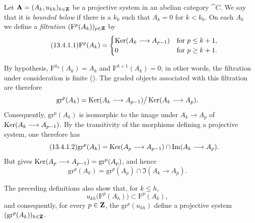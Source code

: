 \begin{env}[13.4.1]
\label{0.13.4.1}
Let
$\mathbf{A}=(A_k,u_{kh})_{k\in\mathbf{Z}}$ be a projective system in an
abelian category $\cat{C}$.
We say that it is \emph{bounded below} if there is a $k_0$ such that
$A_k=0$ for $k<k_0$.
On each $A_k$ we define a \emph{filtration}
$(\mathrm{F}^p(A_k))_{p\in\mathbf{Z}}$ by
\begin{equation}
\label{0.13.4.1.1}
\tag{13.4.1.1}
  \mathrm{F}^p(A_k)=
  \begin{cases}
    \operatorname{Ker}(A_k\longrightarrow A_{p-1}) & \text{for }p\leq k+1,\\
    0 & \text{for }p\geq k+1.
  \end{cases}
\end{equation}

By hypothesis,
$\mathrm{F}^{k_0}(A_k)=A_k$ and
$\mathrm{F}^{k+1}(A_k)=0$; in other words, the filtration under
consideration is finite ().
The graded objects associated with this filtration are therefore
\[
  \mathrm{gr}^p(A_k)
  =
  \operatorname{Ker}(A_k\longrightarrow A_{p-1})
  \big/
  \operatorname{Ker}(A_k\longrightarrow A_p).
\]
Consequently, $\mathrm{gr}^p(A_k)$ is isomorphic to the image under
$A_k\longrightarrow A_p$ of
$\operatorname{Ker}(A_k\longrightarrow A_{p-1})$.
By the transitivity of the morphisms defining a projective system,
one therefore has
\begin{equation}
\label{0.13.4.1.2}
\tag{13.4.1.2}
  \mathrm{gr}^p(A_k)
  =
  \operatorname{Ker}(A_p\longrightarrow A_{p-1})
  \cap
  \operatorname{Im}(A_k\longrightarrow A_p).
\end{equation}
But  gives
$\operatorname{Ker}(A_p\longrightarrow A_{p-1})=\mathrm{gr}^p(A_p)$, and hence
\begin{equation}
\label{0.13.4.1.3}
\tag{13.4.1.3}
  \mathrm{gr}^p(A_k)
  =
  \mathrm{gr}^p(A_p)
  \cap
  \Im(A_k\longrightarrow A_p).
\end{equation}

The preceding definitions also show that, for $k\leq h$,
\[
  u_{kh}\bigl(\mathrm{F}^p(A_h)\bigr)
  \subset
  \mathrm{F}^p(A_k),
\]
and consequently, for every $p\in\mathbf{Z}$, the
$\mathrm{gr}^p(u_{kh})$ define a projective system
$(\mathrm{gr}^p(A_k))_{k\in\mathbf{Z}}$.
\end{env}

